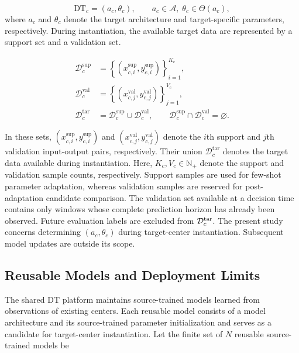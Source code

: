 \documentclass[a4paper,fleqn]{cas-sc}
\begin{document}
\begin{equation}
\mathrm{DT}_{c}
=
\left(
a_c,\theta_c
\right),
\qquad
a_c\in\mathcal{A},\;
\theta_c\in\Theta(a_c),
\label{eq:dt-instance}
\end{equation}
where \(a_c\) and \(\theta_c\) denote the target architecture and target-specific
parameters, respectively. During instantiation, the available target data are
represented by a support set and a validation set.

\begin{equation}
\begin{aligned}
\mathcal{D}_{c}^{\mathrm{sup}}
&=
\left\{
(x_{c,i}^{\mathrm{sup}},y_{c,i}^{\mathrm{sup}})
\right\}_{i=1}^{K_c},
\\
\mathcal{D}_{c}^{\mathrm{val}}
&=
\left\{
(x_{c,j}^{\mathrm{val}},y_{c,j}^{\mathrm{val}})
\right\}_{j=1}^{V_c},
\\
\mathcal{D}_{c}^{\mathrm{tar}}
&=
\mathcal{D}_{c}^{\mathrm{sup}}
\cup
\mathcal{D}_{c}^{\mathrm{val}},
\qquad
\mathcal{D}_{c}^{\mathrm{sup}}
\cap
\mathcal{D}_{c}^{\mathrm{val}}
=
\varnothing .
\end{aligned}
\label{eq:target-data}
\end{equation}

In these sets,
$(x_{c,i}^{\mathrm{sup}},y_{c,i}^{\mathrm{sup}})$ and
$(x_{c,j}^{\mathrm{val}},y_{c,j}^{\mathrm{val}})$ denote the $i$th support
and $j$th validation input-output pairs, respectively. Their union
$\mathcal{D}_{c}^{\mathrm{tar}}$ denotes the target data available during
instantiation. Here, $K_c,V_c\in\mathbb N_+$ denote the support and
validation sample counts, respectively. Support samples are used for few-shot
parameter adaptation, whereas validation samples are reserved for
post-adaptation candidate comparison. The validation set available at a
decision time contains only windows whose complete prediction horizon has
already been observed. Future evaluation labels are excluded from
$\mathcal D_c^{\rm tar}$. The present study concerns
determining $(a_c,\theta_c)$ during target-center instantiation. Subsequent
model updates are outside its scope.

\subsection{Reusable Models and Deployment Limits}

The shared DT platform maintains source-trained models learned from observations
of existing centers. Each reusable model consists of a model architecture
and its source-trained parameter initialization and serves as a candidate for
target-center instantiation. Let the finite set of $N$ reusable source-trained
models be
\end{document}
